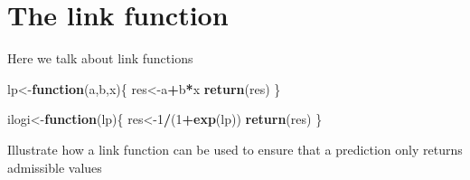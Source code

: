 \documentclass[
]{book}
\newenvironment{Shaded}{\begin{snugshade}}{\end{snugshade}}
\newcommand{\ControlFlowTok}[1]{\textcolor[rgb]{0.13,0.29,0.53}{\textbf{#1}}}
\newcommand{\DecValTok}[1]{\textcolor[rgb]{0.00,0.00,0.81}{#1}}
\newcommand{\FunctionTok}[1]{\textcolor[rgb]{0.13,0.29,0.53}{\textbf{#1}}}
\newcommand{\NormalTok}[1]{#1}
\newcommand{\OtherTok}[1]{\textcolor[rgb]{0.56,0.35,0.01}{#1}}
\newcommand{\SpecialCharTok}[1]{\textcolor[rgb]{0.81,0.36,0.00}{\textbf{#1}}}
\begin{document}
\hypertarget{the-link-function}{%
\section{The link function}\label{the-link-function}}

Here we talk about link functions

\begin{Shaded}
\begin{Highlighting}[]
\NormalTok{lp}\OtherTok{\textless{}{-}}\ControlFlowTok{function}\NormalTok{(a,b,x)\{}
\NormalTok{  res}\OtherTok{\textless{}{-}}\NormalTok{a}\SpecialCharTok{+}\NormalTok{b}\SpecialCharTok{*}\NormalTok{x}
  \FunctionTok{return}\NormalTok{(res)}
\NormalTok{\}}

\NormalTok{ilogi}\OtherTok{\textless{}{-}}\ControlFlowTok{function}\NormalTok{(lp)\{}
\NormalTok{  res}\OtherTok{\textless{}{-}}\DecValTok{1}\SpecialCharTok{/}\NormalTok{(}\DecValTok{1}\SpecialCharTok{+}\FunctionTok{exp}\NormalTok{(lp))}
  \FunctionTok{return}\NormalTok{(res)}
\NormalTok{\}}
\end{Highlighting}
\end{Shaded}

Illustrate how a link function can be used to ensure that a prediction only returns admissible values
\end{document}
